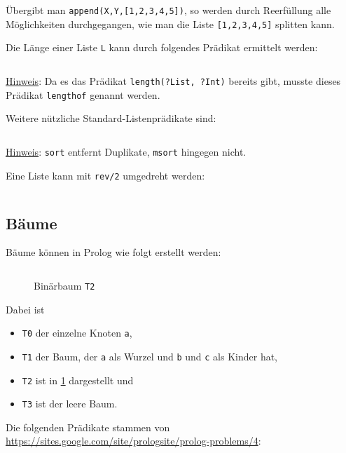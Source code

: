 Übergibt man \texttt{append(X,Y,[1,2,3,4,5])}, so werden durch Reerfüllung alle
Möglichkeiten durchgegangen, wie man die Liste \texttt{[1,2,3,4,5]} splitten kann.

Die Länge einer Liste \texttt{L} kann durch folgendes Prädikat ermittelt werden:%

\inputminted[numbersep=5pt, tabsize=4]{prolog}{scripts/prolog/list-length.pl}

\underline{Hinweis}: Da es das Prädikat \texttt{length(?List, ?Int)} bereits gibt,
musste dieses Prädikat \texttt{lengthof} genannt werden.

Weitere nützliche Standard-Listenprädikate sind:
\inputminted[numbersep=5pt, tabsize=4]{prolog}{scripts/prolog/standard-list-predicates.pl}

\underline{Hinweis}: \texttt{sort} entfernt Duplikate, \texttt{msort} hingegen nicht.

Eine Liste kann mit \texttt{rev/2} umgedreht werden:
\inputminted[numbersep=5pt, tabsize=4]{prolog}{scripts/prolog/reverse-list.pl}

\subsection{Bäume}
Bäume können in Prolog wie folgt erstellt werden:

\inputminted[numbersep=5pt, tabsize=4]{prolog}{scripts/prolog/binary-tree-example.pl}

\begin{figure}[htp]
    \centering
     
    \caption{Binärbaum \texttt{T2}}
    \label{fig:binary-tree-t2}
\end{figure}

Dabei ist
\begin{itemize}
    \item \texttt{T0} der einzelne Knoten \texttt{a},
    \item \texttt{T1} der Baum, der \texttt{a} als Wurzel und \texttt{b} und
          \texttt{c} als Kinder hat,
    \item \texttt{T2} ist in \cref{fig:binary-tree-t2} dargestellt und
    \item \texttt{T3} ist der leere Baum.
\end{itemize}

Die folgenden Prädikate stammen von \url{https://sites.google.com/site/prologsite/prolog-problems/4}:

